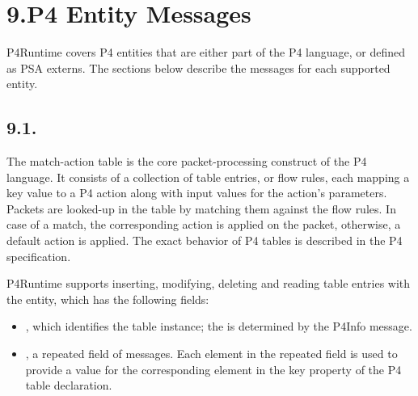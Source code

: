 \documentclass[11pt]{article}
\begin{document}
{%
\section{9.\hspace*{0.5em}P4 Entity Messages}\label{sec-p4-entity-msgs}%

\noindent{}P4Runtime covers P4 entities that are either part of the P4 language, or
defined as PSA externs. The sections below describe the messages for each
supported entity.%

\subsection{9.1.\hspace*{0.5em}}\label{sec-table-entry}%

\noindent{}The match-action table is the core packet-processing construct of the P4
language. It consists of a collection of table entries, or flow rules, each
mapping a key value to a P4 action along with input values for the action's
parameters. Packets are looked-up in the table by matching them against the flow
rules. In case of a match, the corresponding action is applied on the packet,
otherwise, a default action is applied. The exact behavior of P4 tables is
described in the P4 specification.%

P4Runtime supports inserting, modifying, deleting and reading table entries with
the  entity, which has the following fields:%

\begin{itemize}%

\item{}
, which identifies the table instance; the  is determined
by the P4Info message.%

\item{}
, a repeated field of  messages. Each element in the
repeated field is used to provide a value for the corresponding element in the
key property of the P4 table declaration.%


\end{itemize}}
\end{document}
